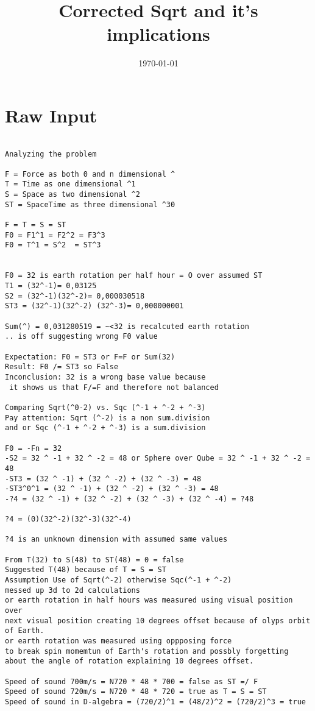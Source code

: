 \documentclass{thesis}
\title{Corrected Sqrt and it's implications}
\author^{R.P.N. Esseling}
\date{\today}
\begin{document}
\maketitle

\section*{Raw Input}
\begin{verbatim}

Analyzing the problem

F = Force as both 0 and n dimensional ^
T = Time as one dimensional ^1
S = Space as two dimensional ^2
ST = SpaceTime as three dimensional ^30

F = T = S = ST
F0 = F1^1 = F2^2 = F3^3
F0 = T^1 = S^2  = ST^3


F0 = 32 is earth rotation per half hour = O over assumed ST 
T1 = (32^-1)= 0,03125
S2 = (32^-1)(32^-2)= 0,000030518
ST3 = (32^-1)(32^-2) (32^-3)= 0,000000001

Sum(^) = 0,031280519 = ~<32 is recalcuted earth rotation 
.. is off suggesting wrong F0 value

Expectation: F0 = ST3 or F=F or Sum(32)
Result: F0 /= ST3 so False
Inconclusion: 32 is a wrong base value because
 it shows us that F/=F and therefore not balanced

Comparing Sqrt(^0-2) vs. Sqc (^-1 + ^-2 + ^-3)
Pay attention: Sqrt (^-2) is a non sum.division 
and or Sqc (^-1 + ^-2 + ^-3) is a sum.division

F0 = -Fn = 32 
-S2 = 32 ^ -1 + 32 ^ -2 = 48 or Sphere over Qube = 32 ^ -1 + 32 ^ -2 = 48
-ST3 = (32 ^ -1) + (32 ^ -2) + (32 ^ -3) = 48
-ST3^0^1 = (32 ^ -1) + (32 ^ -2) + (32 ^ -3) = 48
-?4 = (32 ^ -1) + (32 ^ -2) + (32 ^ -3) + (32 ^ -4) = ?48

?4 = (0)(32^-2)(32^-3)(32^-4)

?4 is an unknown dimension with assumed same values

From T(32) to S(48) to ST(48) = 0 = false
Suggested T(48) because of T = S = ST
Assumption Use of Sqrt(^-2) otherwise Sqc(^-1 + ^-2) 
messed up 3d to 2d calculations 
or earth rotation in half hours was measured using visual position over 
next visual position creating 10 degrees offset because of olyps orbit of Earth.
or earth rotation was measured using oppposing force
to break spin momemtun of Earth's rotation and possbly forgetting 
about the angle of rotation explaining 10 degrees offset.

Speed of sound 700m/s = N720 * 48 * 700 = false as ST =/ F
Speed of sound 720m/s = N720 * 48 * 720 = true as T = S = ST 
Speed of sound in D-algebra = (720/2)^1 = (48/2)^2 = (720/2)^3 = true


\end{verbatim}
\end{document}
